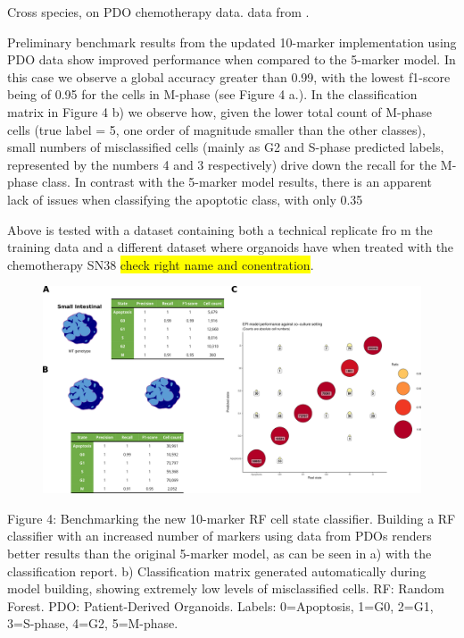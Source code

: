 Cross species, on PDO chemotherapy data. data from \cite{zapatero_trellis_2023}.

Preliminary benchmark results from the updated 10-marker implementation using PDO data show improved performance when compared to the 5-marker model. In this case we observe a global accuracy greater than 0.99, with the lowest f1-score being of 0.95 for the cells in M-phase (see Figure 4 a.). In the classification matrix in Figure 4 b) we observe how, given the lower total count of M-phase cells (true label = 5, one order of magnitude smaller than the other classes), small numbers of misclassified cells (mainly as G2 and S-phase predicted labels, represented by the numbers 4 and 3 respectively) drive down the recall for the M-phase class. 
In contrast with the 5-marker model results, there is an apparent lack of issues when classifying the apoptotic class, with only 0.35%

Above is tested with a dataset containing both a technical replicate fro m the training data and a different dataset where organoids have when treated with the chemotherapy SN38 \colorbox{yellow}{check right name and conentration}. 

\begin{figure}
    \centering
    \includegraphics{03cytof/figs/3CLASS_10m.png}
    \caption{}
    \label{fig:3class10m}
\end{figure}
 
Figure 4: Benchmarking the new 10-marker RF cell state classifier. Building a RF classifier with an increased number of markers using data from PDOs renders better results than the original 5-marker model, as can be seen in a) with the classification report. b) Classification matrix generated automatically during model building, showing extremely low levels of misclassified cells. RF: Random Forest. PDO: Patient-Derived Organoids. Labels: 0=Apoptosis, 1=G0, 2=G1, 3=S-phase, 4=G2, 5=M-phase.

